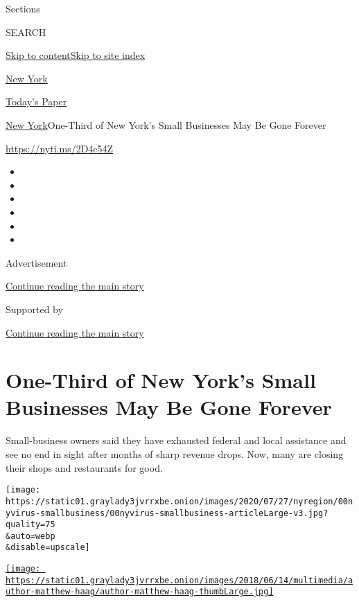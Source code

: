 Sections

SEARCH

\protect\hyperlink{site-content}{Skip to
content}\protect\hyperlink{site-index}{Skip to site index}

\href{https://www.nytimes3xbfgragh.onion/section/nyregion}{New York}

\href{https://myaccount.nytimes3xbfgragh.onion/auth/login?response_type=cookie\&client_id=vi}{}

\href{https://www.nytimes3xbfgragh.onion/section/todayspaper}{Today's
Paper}

\href{/section/nyregion}{New York}\textbar{}One-Third of New York's
Small Businesses May Be Gone Forever

\url{https://nyti.ms/2D4c54Z}

\begin{itemize}
\item
\item
\item
\item
\item
\item
\end{itemize}

Advertisement

\protect\hyperlink{after-top}{Continue reading the main story}

Supported by

\protect\hyperlink{after-sponsor}{Continue reading the main story}

\hypertarget{one-third-of-new-yorks-small-businesses-may-be-gone-forever}{%
\section{One-Third of New York's Small Businesses May Be Gone
Forever}\label{one-third-of-new-yorks-small-businesses-may-be-gone-forever}}

Small-business owners said they have exhausted federal and local
assistance and see no end in sight after months of sharp revenue drops.
Now, many are closing their shops and restaurants for good.

\texttt{[image: https://static01.graylady3jvrrxbe.onion/images/2020/07/27/nyregion/00nyvirus-smallbusiness/00nyvirus-smallbusiness-articleLarge-v3.jpg?quality=75\\\&auto=webp\\\&disable=upscale]}

\href{https://www.nytimes3xbfgragh.onion/by/matthew-haag}{\texttt{[image: https://static01.graylady3jvrrxbe.onion/images/2018/06/14/multimedia/author-matthew-haag/author-matthew-haag-thumbLarge.jpg]}}

